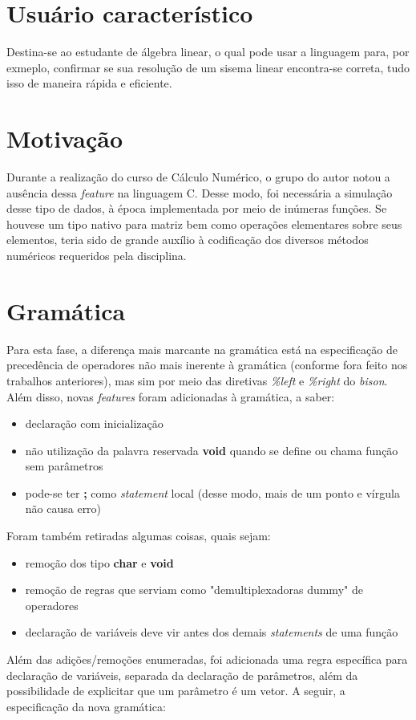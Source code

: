 \documentclass[
	article,			%
	11pt,				%
	oneside,			%
	a4paper,			%
	english,			%
	brazil,				%
	sumario=tradicional
	]{abntex2}
\renewcommand{\it}[1]{\textit{#1}}
\renewcommand{\bf}[1]{\textbf{#1}}
\begin{document}
\section{Usuário característico}
Destina-se ao estudante de álgebra linear, o qual pode usar a linguagem para, por exmeplo, confirmar se sua resolução de um sisema linear encontra-se correta, tudo isso de maneira rápida e eficiente.

\section{Motivação}
Durante a realização do curso de Cálculo Numérico, o grupo do autor notou a ausência dessa \it{feature} na linguagem C. Desse modo, foi necessária a simulação desse tipo de dados, à época implementada por meio de inúmeras funções. Se houvese um tipo nativo para matriz bem como operações elementares sobre seus elementos, teria sido de grande auxílio à codificação dos diversos métodos numéricos requeridos pela disciplina.
\par


\section{Gramática}

Para esta fase, a diferença mais marcante na gramática está na especificação de precedência de operadores não mais inerente à gramática (conforme fora feito nos trabalhos anteriores), mas sim por meio das diretivas \it{\%left} e \it{\%right} do \it{bison}. Além disso, novas \it{features} foram adicionadas à gramática, a saber:
\begin{itemize}
	\item declaração com inicialização
	\item não utilização da palavra reservada \bf{void} quando se define ou chama função sem parâmetros
	\item pode-se ter \bf{;} como \it{statement} local (desse modo, mais de um ponto e vírgula não causa erro)	
\end{itemize}
Foram também retiradas algumas coisas, quais sejam:
\begin{itemize}
	\item remoção dos tipo \bf{char} e \bf{void}
	\item remoção de regras que serviam como "demultiplexadoras dummy" de operadores
	\item declaração de variáveis deve vir antes dos demais \it{statements} de uma função
\end{itemize}
Além das adições/remoções enumeradas, foi adicionada uma regra específica para declaração de variáveis, separada da declaração de parâmetros, além da possibilidade de explicitar que um parâmetro é um vetor.
A seguir, a especificação da nova gramática:
	
\end{document}
